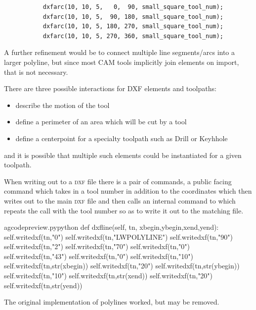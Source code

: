\documentclass{ltxdoc}
\begin{document}
\begin{verbatim}
           dxfarc(10, 10, 5,   0,  90, small_square_tool_num);
           dxfarc(10, 10, 5,  90, 180, small_square_tool_num);
           dxfarc(10, 10, 5, 180, 270, small_square_tool_num);
           dxfarc(10, 10, 5, 270, 360, small_square_tool_num);
\end{verbatim}
 
A further refinement would be to connect multiple line segments/arcs into a larger polyline, but since most CAM tools implicitly join elements on import, that is not necessary.
 
There are three possible interactions for DXF elements and toolpaths:

\begin{itemize}
 \item describe the motion of the tool
 \item define a perimeter of an area which will be cut by a tool
 \item define a centerpoint for a specialty toolpath such as Drill or Keyhhole
\end{itemize}
 
\noindent and it is possible that multiple such elements could be instantiated for a given toolpath.
 
When writing out to a \textsc{dxf} file there is a pair of commands, a public facing command which takes in a tool number in addition to the coordinates which then writes out to the main \textsc{dxf} file and then calls an internal command to which repeats the call with the tool number so as to write it out to the matching file.

\lstset{firstnumber=\thegcpy}
\begin{writecode}{a}{gcodepreview.py}{python}
    def dxfline(self, tn, xbegin,ybegin,xend,yend):
        self.writedxf(tn,"0")
        self.writedxf(tn,"LWPOLYLINE")
        self.writedxf(tn,"90")
        self.writedxf(tn,"2")
        self.writedxf(tn,"70")
        self.writedxf(tn,"0")
        self.writedxf(tn,"43")
        self.writedxf(tn,"0")
        self.writedxf(tn,"10")
        self.writedxf(tn,str(xbegin))
        self.writedxf(tn,"20")
        self.writedxf(tn,str(ybegin))
        self.writedxf(tn,"10")
        self.writedxf(tn,str(xend))
        self.writedxf(tn,"20")
        self.writedxf(tn,str(yend))

\end{writecode}
\addtocounter{gcpy}{18}

The original implementation of polylines worked, but may be removed.
 
\end{document}
